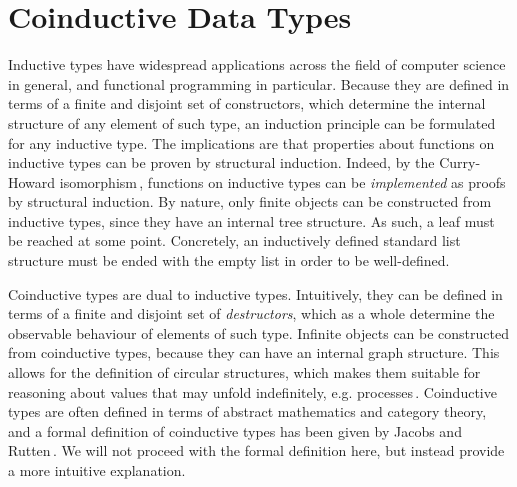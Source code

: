 \section{Coinductive Data Types}
\label{sec:coinductive-types}
\newcommand{\bisim}{\text{\texttildelow}}

Inductive types have widespread applications across the field of computer
science in general, and functional programming in particular. Because they are
defined in terms of a finite and disjoint set of constructors, which determine
the internal structure of any element of such type, an induction
principle can be formulated for any inductive type. The implications are that
properties about functions on inductive types can be proven by structural
induction. Indeed, by the Curry-Howard
isomorphism\,\citep{Curry1934,Howard80,Wadler2014}, functions on inductive types
can be \emph{implemented} as proofs by structural induction. By nature, only
finite objects can be constructed from inductive types, since they have an
internal tree structure. As such, a leaf must be reached at some
point. Concretely, an inductively defined standard list structure must be ended
with the empty list in order to be well-defined.

Coinductive types are dual to inductive types. Intuitively, they can be defined
in terms of a finite and disjoint set of \emph{destructors}, which as a whole
determine the observable behaviour of elements of such type. Infinite objects
can be constructed from coinductive types, because they can have an internal
graph structure. This allows for the definition of circular structures, which
makes them suitable for reasoning about values that may unfold indefinitely,
e.g. processes\,\citep{Sangiorgi2011}. Coinductive types are often defined in
terms of abstract mathematics and category theory, and a formal definition of
coinductive types has been given by Jacobs and
Rutten\,\citep{Jacobs97atutorial}. We will not proceed with the formal
definition here, but instead provide a more intuitive explanation.

